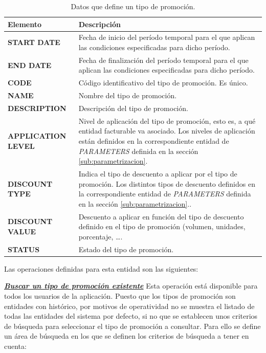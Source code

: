 \begin{table}[H]
  \centering
  \setlength{\leftmargini}{0.4cm}
  \resizebox{14cm}{!} {
  \begin{tabular}{|m{3cm} m{11cm}|}
  \rowcolor{udcpink!25}
  \hline
  	\textbf{Elemento} & \textbf{Descripción} \\\hline
  	\textbf{START DATE} & Fecha de inicio del período temporal para el que aplican las condiciones especificadas para dicho período.\\
  	\textbf{END DATE} & Fecha de finalización del período temporal para el que aplican las condiciones especificadas para dicho período.\\
  	\textbf{CODE} & Código identificativo del tipo de promoción. Es único.\\
	\textbf{NAME} & Nombre del tipo de promoción.\\
	\textbf{DESCRIPTION} & Descripción del tipo de promoción.\\
	\textbf{APPLICATION LEVEL} & Nivel de aplicación del tipo de promoción, esto es, a qué entidad facturable va asociado. Los niveles de aplicación están definidos en la correspondiente entidad de \emph{PARAMETERS} definida en la sección \ref{sub:parametrizacion}.\\	
	\textbf{DISCOUNT TYPE} & Indica el tipo de descuento a aplicar por el tipo de promoción. Los distintos tipos de descuento definidos en la correspondiente entidad de \emph{PARAMETERS} definida en la sección \ref{sub:parametrizacion}..\\
	\textbf{DISCOUNT VALUE} & Descuento a aplicar en función del tipo de descuento definido en el tipo de promoción (volumen, unidades, porcentaje, \dots.\\
	\textbf{STATUS} & Estado del tipo de promoción.	
	\\\hline
  \end{tabular}
  } %
  \caption{Datos que define un tipo de promoción.}
  \label{tab:tipo-cuota}
\end{table}



Las operaciones definidas para esta entidad son las siguientes:

\underline{\textsl{\textbf{Buscar un tipo de promoción existente}}}\newline
Esta operación está disponible para todos los usuarios de la aplicación.
Puesto que los tipos de promoción son entidades con histórico, por motivos de operatividad no se muestra el listado de todas las entidades del sistema por defecto, si no que se establecen unos criterios de búsqueda para seleccionar el tipo de promoción a consultar. Para ello se define un área de búsqueda en los que se definen los criterios de búsqueda a tener en cuenta:

